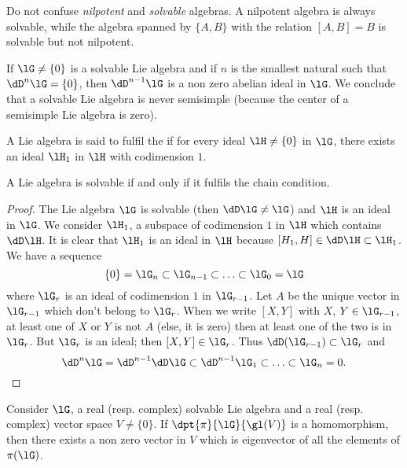 Do not confuse \emph{nilpotent} and \emph{solvable} algebras. A nilpotent algebra is always solvable, while the algebra spanned by $\{ A,B \}$ with the relation $[A,B]=B$ is solvable but not nilpotent.

If $\lG\neq\{0\}$ is a solvable Lie algebra and if $n$ is the smallest natural such that $\dD^n\lG=\{0\}$, then $\dD^{n-1}\lG$ is a non zero abelian ideal in $\lG$. We conclude that a solvable Lie algebra is never semisimple (because the center of a semisimple Lie algebra is zero).

A Lie algebra is said to fulfil the  if for every ideal $\lH\neq\{0\}$ in $\lG$, there exists an ideal $\lH_1$ in $\lH$ with codimension $1$.

\begin{lemma}
A Lie algebra is solvable if and only if it fulfils the chain condition.
\end{lemma}

\begin{proof}
The Lie algebra $\lG$ is solvable (then $\dD\lG\neq\lG$) and $\lH$ is an ideal in $\lG$. We consider $\lH_1$, a subspace of codimension $1$ in $\lH$ which contains $\dD\lH$. It is clear that $\lH_1$ is an ideal in $\lH$ because $[H_1,H]\in\dD\lH\subset\lH_1$.
We have a sequence
\begin{equation}\label{eq:solvable_chaine}
   \{0\}=\lG_n\subset\lG_{n-1}\subset\ldots\subset\lG_0=\lG
\end{equation}
where $\lG_r$ is an ideal of codimension $1$ in $\lG_{r-1}$. Let $A$ be the unique vector in $\lG_{r-1}$ which don't belong to $\lG_r$.  When we write $[X,Y]$ with $X$, $Y\in\lG_{r-1}$, at least one of $X$ or $Y$ is not $A$ (else, it is zero) then at least one of the two is in $\lG_r$. But $\lG_r$ is an ideal; then $[X,Y]\in\lG_r$. Thus $\dD(\lG_{r-1})\subset\lG_r$ and
\[
\dD^n\lG=\dD^{n-1}\dD\lG\subset\dD^{n-1}\lG_1\subset\ldots\subset\lG_n=0.
\]
\end{proof}

\begin{theorem}\label{tho:Lie_Vu}
    Consider $\lG$, a real (resp. complex) solvable Lie algebra and a real (resp. complex) vector space $V\neq\{0\}$. If $\dpt{\pi}{\lG}{\gl(V)}$ is a homomorphism, then there exists a non zero vector in $V$ which is eigenvector of all the elements of $\pi(\lG)$.
\end{theorem}

